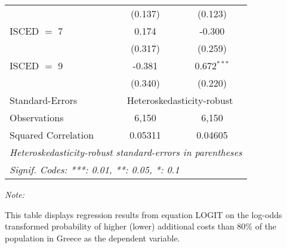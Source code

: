 \begin{table}[htbp!]
\begin{adjustbox}{width = 1\textwidth, max height = 0.95\textheight, center}
\begin{threeparttable}[b]
\begin{tabular}{lcc}
                                 & (0.137)        & (0.123)\\   
            ISCED $=$ 7          & 0.174          & -0.300\\   
                                 & (0.317)        & (0.259)\\   
            ISCED $=$ 9          & -0.381         & 0.672$^{***}$\\   
                                 & (0.340)        & (0.220)\\   
            \midrule 
            Standard-Errors & \multicolumn{2}{c}{Heteroskedasticity-robust} \\ 
            Observations         & 6,150          & 6,150\\  
            Squared Correlation  & 0.05311        & 0.04605\\  
            \midrule \midrule
            \multicolumn{3}{l}{\emph{Heteroskedasticity-robust standard-errors in parentheses}}\\
            \multicolumn{3}{l}{\emph{Signif. Codes: ***: 0.01, **: 0.05, *: 0.1}}\\
         \end{tabular}
         
         \begin{tablenotes}\item \medskip \textit{Note:}
            \item This table displays regression results from equation LOGIT on the log-odds transformed probability of higher (lower) additional costs than 80\% of the population in Greece as the dependent variable. 
         \end{tablenotes}
      \end{threeparttable}
   \end{adjustbox}
\end{table}


